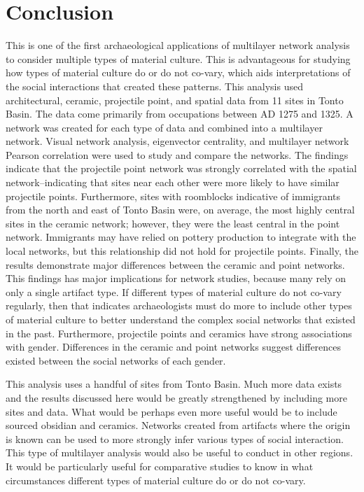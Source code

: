\documentclass[]{interact}
\theoremstyle{plain}%
\theoremstyle{definition}
\theoremstyle{remark}
\begin{document}
\hypertarget{conclusion}{%
\section*{Conclusion}\label{conclusion}}

This is one of the first archaeological applications of multilayer
network analysis to consider multiple types of material culture. This is
advantageous for studying how types of material culture do or do not
co-vary, which aids interpretations of the social interactions that
created these patterns. This analysis used architectural, ceramic,
projectile point, and spatial data from 11 sites in Tonto Basin. The
data come primarily from occupations between AD 1275 and 1325. A network
was created for each type of data and combined into a multilayer
network. Visual network analysis, eigenvector centrality, and multilayer
network Pearson correlation were used to study and compare the networks.
The findings indicate that the projectile point network was strongly
correlated with the spatial network--indicating that sites near each
other were more likely to have similar projectile points. Furthermore,
sites with roomblocks indicative of immigrants from the north and east
of Tonto Basin were, on average, the most highly central sites in the
ceramic network; however, they were the least central in the point
network. Immigrants may have relied on pottery production to integrate
with the local networks, but this relationship did not hold for
projectile points. Finally, the results demonstrate major differences
between the ceramic and point networks. This findings has major
implications for network studies, because many rely on only a single
artifact type. If different types of material culture do not co-vary
regularly, then that indicates archaeologists must do more to include
other types of material culture to better understand the complex social
networks that existed in the past. Furthermore, projectile points and
ceramics have strong associations with gender. Differences in the
ceramic and point networks suggest differences existed between the
social networks of each gender.

This analysis uses a handful of sites from Tonto Basin. Much more data
exists and the results discussed here would be greatly strengthened by
including more sites and data. What would be perhaps even more useful
would be to include sourced obsidian and ceramics. Networks created from
artifacts where the origin is known can be used to more strongly infer
various types of social interaction. This type of multilayer analysis
would also be useful to conduct in other regions. It would be
particularly useful for comparative studies to know in what
circumstances different types of material culture do or do not co-vary.
\end{document}
